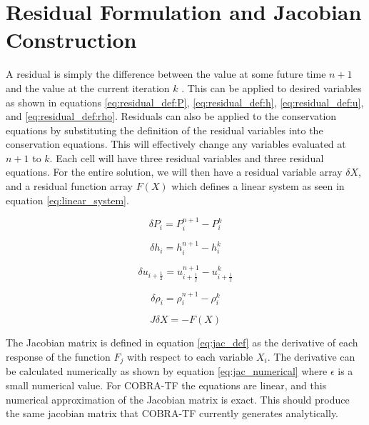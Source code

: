 \vspace*{-80mm}
\chapter{Residual Formulation and Jacobian Construction}
\label{chapter3:residual_formulation}
	    
    A residual is simply the difference between the value at some future time
    $n+1$ and the value at the current iteration $k$ \cite{kelly1995}. This can
    be applied to desired variables as shown in equations
    \eqref{eq:residual_def:P}, \eqref{eq:residual_def:h},
    \eqref{eq:residual_def:u}, and \eqref{eq:residual_def:rho}. Residuals can
    also be applied to the conservation equations by substituting the definition
    of the residual variables into the conservation equations. This will
    effectively change any variables evaluated at $n+1$ to $k$. Each cell will
    have three residual variables and three residual equations. For the entire
    solution, we will then have a residual variable array $\delta X$, and a
    residual function array $F(X)$ which defines a linear system as seen in 
    equation \eqref{eq:linear_system}.
        
    \begin{equation}
    	\label{eq:residual_def:P}
    	\delta P_{i} = P^{n+1}_{i} - P^{k}_{i}
    \end{equation}
    
    \begin{equation}
    	\label{eq:residual_def:h}
    	\delta h_{i} = h^{n+1}_{i} - h^{k}_{i}
    \end{equation}
    
    \begin{equation}
    	\label{eq:residual_def:u}
    	\delta u_{i+\frac{1}{2}} = u^{n+1}_{i+\frac{1}{2}} - u^{k}_{i+\frac{1}{2}}
    \end{equation}
    
    \begin{equation}
    	\label{eq:residual_def:rho}
    	\delta \rho_{i} = \rho^{n+1}_{i} - \rho^{k}_{i}
    \end{equation}
    
    \begin{equation}
    	\label{eq:linear_system}
    	J \delta X = - F(X)
    \end{equation}
    
    The Jacobian matrix is defined in equation \eqref{eq:jac_def} as the derivative
    of each response of the function $F_{j}$ with respect to each variable $X_{i}$.
    The derivative can be calculated numerically as shown by equation
    \eqref{eq:jac_numerical} where $\epsilon$ is a small numerical value. For
    COBRA-TF the equations are linear, and this numerical approximation
    of the Jacobian matrix is exact. This should produce the same jacobian
    matrix that COBRA-TF currently generates analytically. 
    
